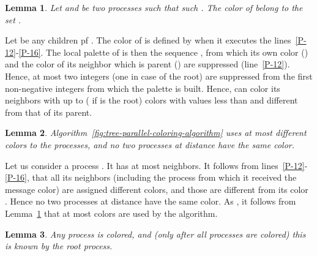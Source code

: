 \documentclass[11pt,english]{article}
\newtheorem{lemma}{Lemma}
\newcommand{\toto}{xxx}
\newenvironment{proofL}{\noindent{\bf
Proof }} {\hspace*{\fill}\par\vspace{3mm}}
\begin{document}
\begin{lemma}
\label{lemma:color-size}
Let  and   be two processes such that such  . 
The color of  belong to the set . 
\end{lemma}

\begin{proofL}
  Let  be any children pf .  The color of  is defined
  by  when it executes the lines~\ref{P-12}-\ref{P-16}.  The
  local palette of  is then the sequence , from which
  its own color () and the color of its neighbor which is
  parent () are suppressed (line~\ref{P-12}).  Hence, at
  most two integers (one in case of the root) are suppressed from the
  first  non-negative integers from which the palette is
  built.  Hence,  can color its neighbors with up to 
  ( if  is the root) colors with values less than
   and different from that of its parent.
  \renewcommand{\toto}{lemma:color-size}
\end{proofL}

\begin{lemma}
\label{lemma:par-proper-color-bound}
Algorithm~{\em\ref{fig:tree-parallel-coloring-algorithm}} 
uses at most  different colors to the processes, and no
two processes at distance  have the same color.
\end{lemma}

\begin{proofL}
Let us consider a process . It has at most  neighbors. 
It follows from lines~\ref{P-12}-\ref{P-16}, that all its  
neighbors (including the process from which it received the message 
{\sc color}) are  assigned different colors, and those are 
different from its color . Hence no two processes at distance 
 have the same color. As , 
it follows from  Lemma~\ref{lemma:color-size} that at most 
 colors are used by the algorithm. 
\renewcommand{\toto}{lemma:par-proper-color-bound}
\end{proofL}




\begin{lemma}
\label{lemma:par-termination}
Any process is colored, and (only after all processes are colored) 
this is known by the root process. 
\end{lemma}
\end{document}
